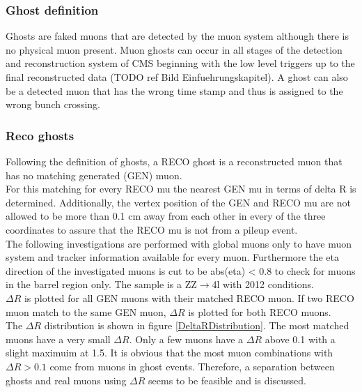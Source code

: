 \subsubsection{Ghost definition}
Ghosts are faked muons that are detected by the muon system although there is no physical muon present.
Muon ghosts can occur in all stages of the detection and reconstruction system of CMS beginning with the low level triggers up to the final reconstructed data (TODO ref Bild Einfuehrungskapitel).
A ghost can also be a detected muon that has the wrong time stamp and thus is assigned to the wrong bunch crossing.

\subsubsection{Reco ghosts}
Following the definition of ghosts, a RECO ghost is a reconstructed muon that has no matching generated (GEN) muon.\\
For this matching for every RECO mu the nearest GEN mu in terms of delta R is determined. Additionally, the vertex position of the GEN and RECO mu are not allowed to be more than 0.1 cm away from each other in every of the three coordinates to assure that the RECO mu is not from a pileup event.\\
The following investigations are performed with global muons only to have muon system and tracker information available for every muon. Furthermore the eta direction of the investigated muons is cut to be abs(eta) < 0.8 to check for muons in the barrel region only. The sample is a ZZ$\to$4l with 2012 conditions.\\
$\Delta R$ is plotted for all GEN muons with their matched RECO muon. If two RECO muon match to the same GEN muon, $\Delta R$ is plotted for both RECO muons.\\
The $\Delta R$ distribution is shown in figure \ref{DeltaRDistribution}. The most matched muons have a very small $\Delta R$. Only a few muons have a $\Delta R$ above 0.1 with a slight maximuim at 1.5. It is obvious that the most muon combinations with $\Delta R > 0.1$ come from muons in ghost events. Therefore, a separation between ghosts and real muons using $\Delta R$ seems to be feasible and is discussed.\\
